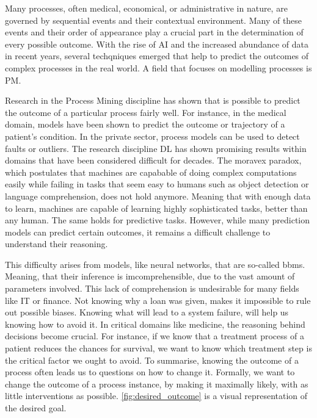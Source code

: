 \documentclass[./../../paper.tex]{subfiles}
\begin{document}
Many processes, often medical, economical, or administrative in nature, are governed by sequential events and their contextual environment. Many of these events and their order of appearance play a crucial part in the determination of every possible outcome\needscite{}. With the rise of AI and the increased abundance of data in recent years, several techqniques emerged that help to predict the outcomes of complex processes in the real world. A field that focuses on modelling processes is \gls{PM}.

Research in the Process Mining discipline has shown that is possible to predict the outcome of a particular process fairly well\needscite{}. 
For instance, in the medical domain, models have been shown to predict the outcome or trajectory of a patient's condition\needscite{}. In the private sector, process models can be used to detect faults or outliers. The research discipline \gls{DL} has shown promising results within domains that have been considered difficult for decades. The moravex paradox, which postulates that machines are capabable of doing complex computations easily while failing in tasks that seem easy to humans such as object detection or language comprehension, does not hold anymore. Meaning that with enough data to learn, machines are capable of learning highly sophisticated tasks, better than any human. The same holds for predictive tasks. However, while many prediction models can predict certain outcomes, it remains a difficult challenge to understand their reasoning. 

This difficulty arises from models, like neural networks, that are so-called \glspl{bbm}. Meaning, that their inference is imcomprehensible, due to the vast amount of parameters involved. This lack of comprehension is undesirable for many fields like IT or finance. Not knowing why a loan was given, makes it impossible to rule out possible biases. Knowing what will lead to a system failure, will help us knowing how to avoid it. In critical domains like medicine, the reasoning behind decisions become crucial. For instance, if we know that a treatment process of a patient reduces the chances for survival, we want to know which treatment step is the critical factor we ought to avoid. To summarise, knowing the outcome of a process often leads us to questions on how to change it. Formally, we want to change the outcome of a process instance, by making it maximally likely, with as little interventions as possible\needscite{}. \autoref{fig:desired_outcome} is a visual representation of the desired goal.
\end{document}
